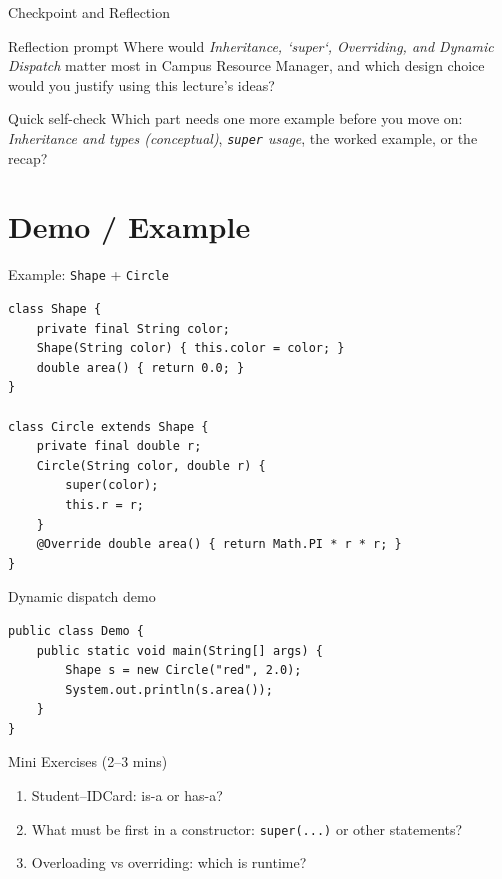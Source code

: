 \documentclass{beamer}
\begin{document}
\begin{frame}{Checkpoint and Reflection}
\begin{block}{Reflection prompt}
Where would \textit{Inheritance, `super`, Overriding, and Dynamic Dispatch} matter most in Campus Resource Manager, and which design choice would you justify using this lecture's ideas?
\end{block}
\begin{block}{Quick self-check}
Which part needs one more example before you move on: \textit{Inheritance and types (conceptual)}, \textit{\texttt{super} usage}, the worked example, or the recap?
\end{block}
  \slidesources{\OOPSUnitIISources}
\end{frame}

\section{Demo / Example}
\label{sec:demo}

\begin{frame}[fragile,shrink=8]{Example: \texttt{Shape} + \texttt{Circle}}
\begin{lstlisting}
class Shape {
    private final String color;
    Shape(String color) { this.color = color; }
    double area() { return 0.0; }
}

class Circle extends Shape {
    private final double r;
    Circle(String color, double r) {
        super(color);
        this.r = r;
    }
    @Override double area() { return Math.PI * r * r; }
}
\end{lstlisting}
  \slidesources{\OOPSUnitIISources}
\end{frame}

\begin{frame}[fragile,shrink=8]{Dynamic dispatch demo}
\begin{lstlisting}
public class Demo {
    public static void main(String[] args) {
        Shape s = new Circle("red", 2.0);
        System.out.println(s.area());
    }
}
\end{lstlisting}
  \slidesources{\OOPSUnitIISources}
\end{frame}

\begin{frame}{Mini Exercises (2--3 mins)}
  \begin{enumerate}[<+->]
    \item Student--IDCard: is-a or has-a?
    \item What must be first in a constructor: \texttt{super(...)} or other statements?
    \item Overloading vs overriding: which is runtime?
  \end{enumerate}
  \slidesources{\OOPSUnitIISources}
\end{frame}
\end{document}
